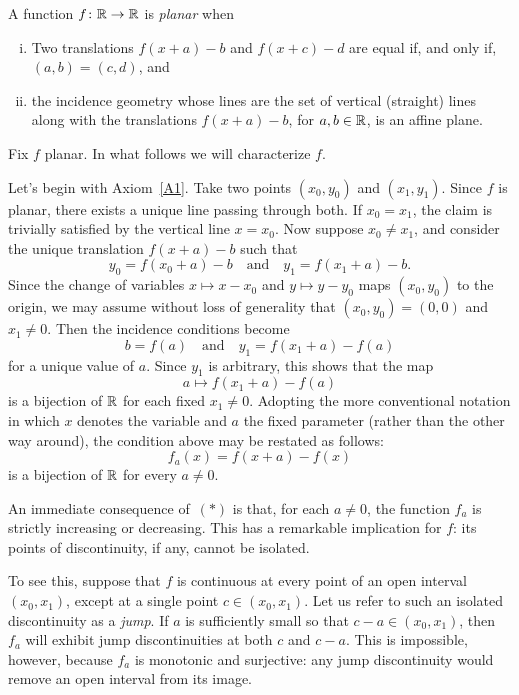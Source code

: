 \begin{solution}
    A function $f\colon\mathbb{R}\to\mathbb{R}$ is \textsl{planar} when
    \begin{enumerate}[i)]
        \item Two translations $f(x+a)-b$ and $f(x+c)-d$ are equal if, and only if, $(a,b)=(c,d)$, and

        \item the incidence geometry whose lines are the set of vertical (straight) lines along with the translations $f(x+a)-b$, for $a,b\in\mathbb{R}$, is an affine plane.
    \end{enumerate}
    
    \medskip
    
    Fix $f$ planar. In what follows we will characterize $f$.
    
    Let's begin with Axiom~\ref{A1}. Take two points $(x_0,y_0)$ and $(x_1,y_1)$. Since $f$ is planar, there exists a unique line passing through both. If $x_0 = x_1$, the claim is trivially satisfied by the vertical line $x = x_0$. Now suppose $x_0 \ne x_1$, and consider the unique translation $f(x + a) - b$ such that
    \[
        y_0 = f(x_0 + a) - b \quad \text{and} \quad y_1 = f(x_1 + a) - b.
    \]
    Since the change of variables $x \mapsto x - x_0$ and $y \mapsto y - y_0$ maps $(x_0, y_0)$ to the origin, we may assume without loss of generality that $(x_0, y_0) = (0, 0)$ and $x_1 \ne 0$. Then the incidence conditions become
    \[
        b = f(a) \quad \text{and} \quad y_1 = f(x_1 + a) - f(a)
    \]
    for a unique value of $a$. Since $y_1$ is arbitrary, this shows that the map
    $$
        a \mapsto f(x_1 + a) - f(a)
    $$
    is a bijection of $\mathbb{R}$ for each fixed $x_1 \ne 0$. Adopting the more conventional notation in which $x$ denotes the variable and $a$ the fixed parameter (rather than the other way around), the condition above may be restated as follows:
    \[
        f_a(x) = f(x+a) - f(x) \tag{$\ast$}
    \]
    is a bijection of\/ $\mathbb{R}$ for every $a \ne 0$.

    An immediate consequence of~$(\ast)$ is that, for each $a\ne0$, the function $f_a$ is strictly increasing or decreasing. This has a remarkable implication for $f$: its points of discontinuity, if any, cannot be isolated. 

    To see this, suppose that $f$ is continuous at every point of an open interval $(x_0, x_1)$, except at a single point $c \in (x_0, x_1)$. Let us refer to such an isolated discontinuity as a \textsl{jump}. If $a$ is sufficiently small so that $c - a \in (x_0, x_1)$, then $f_a$ will exhibit jump discontinuities at both $c$ and $c - a$. This is impossible, however, because $f_a$ is monotonic and surjective: any jump discontinuity would remove an open interval from its image.
    

\end{solution}
